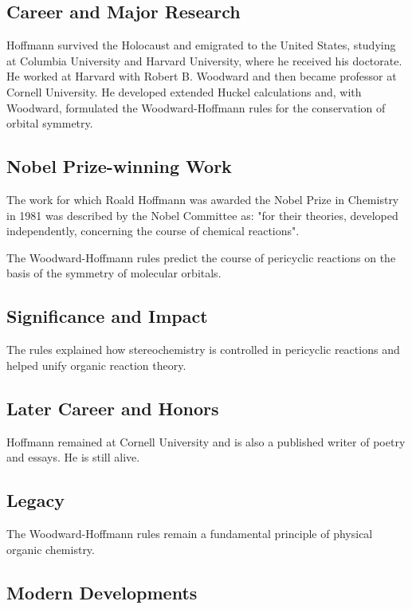 \subsection*{Career and Major Research}

Hoffmann survived the Holocaust and emigrated to the United States, studying at Columbia University and Harvard University, where he received his doctorate. He worked at Harvard with Robert B. Woodward and then became professor at Cornell University. He developed extended Huckel calculations and, with Woodward, formulated the Woodward-Hoffmann rules for the conservation of orbital symmetry.

\subsection*{Nobel Prize-winning Work}

The work for which Roald Hoffmann was awarded the Nobel Prize in Chemistry in 1981 was described by the Nobel Committee as: "for their theories, developed independently, concerning the course of chemical reactions".

The Woodward-Hoffmann rules predict the course of pericyclic reactions on the basis of the symmetry of molecular orbitals.

\subsection*{Significance and Impact}

The rules explained how stereochemistry is controlled in pericyclic reactions and helped unify organic reaction theory.

\subsection*{Later Career and Honors}

Hoffmann remained at Cornell University and is also a published writer of poetry and essays. He is still alive.

\subsection*{Legacy}

The Woodward-Hoffmann rules remain a fundamental principle of physical organic chemistry.

\subsection*{Modern Developments}

